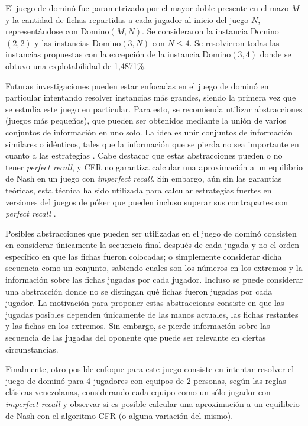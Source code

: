 El juego de dominó fue parametrizado por el mayor doble presente en el mazo $M$ y la cantidad de fichas repartidas a cada jugador al inicio del juego $N$, representándose con Domino$(M, N)$. Se consideraron la instancia Domino$(2, 2)$ y las instancias Domino$(3, N)$ con $N \leq 4$. Se resolvieron todas las instancias propuestas con la excepción de la instancia Domino$(3, 4)$ donde se obtuvo una explotabilidad de 1,4871\%.

Futuras investigaciones pueden estar enfocadas en el juego de dominó en particular intentando resolver instancias más grandes, siendo la primera vez que se estudia este juego en particular. Para esto, se recomienda utilizar abstracciones (juegos más pequeños), que pueden ser obtenidos mediante la unión de varios conjuntos de información en uno solo. La idea es unir conjuntos de información similares o idénticos, tales que la información que se pierda no sea importante en cuanto a las estrategias \cite[pp.~71-72]{bib:thesis-marc-lanctot}. Cabe destacar que estas abstracciones pueden o no tener \textit{perfect recall}, y CFR no garantiza calcular una aproximación a un equilibrio de Nash en un juego con \textit{imperfect recall}. Sin embargo, aún sin las garantías teóricas, esta técnica ha sido utilizada para calcular estrategias fuertes en versiones del juegos de póker que pueden incluso superar sus contrapartes con \textit{perfect recall} \cite{bib:imperfect-recall}.

Posibles abstracciones que pueden ser utilizadas en el juego de dominó consisten en considerar únicamente la secuencia final después de cada jugada y no el orden específico en que las fichas fueron colocadas; o simplemente considerar dicha secuencia como un conjunto, sabiendo cuales son los números en los extremos y la información sobre las fichas jugadas por cada jugador. Incluso se puede considerar una abstracción donde no se distingan qué fichas fueron jugadas por cada jugador. La motivación para proponer estas abstracciones consiste en que las jugadas posibles dependen únicamente de las manos actuales, las fichas restantes y las fichas en los extremos. Sin embargo, se pierde información sobre las secuencia de las jugadas del oponente que puede ser relevante en ciertas circunstancias.

Finalmente, otro posible enfoque para este juego consiste en intentar resolver el juego de dominó para 4 jugadores con equipos de 2 personas, según las reglas cĺásicas venezolanas, considerando cada equipo como un sólo jugador con \textit{imperfect recall} y observar si es posible calcular una aproximación a un equilibrio de Nash con el algoritmo CFR (o alguna variación del mismo).
